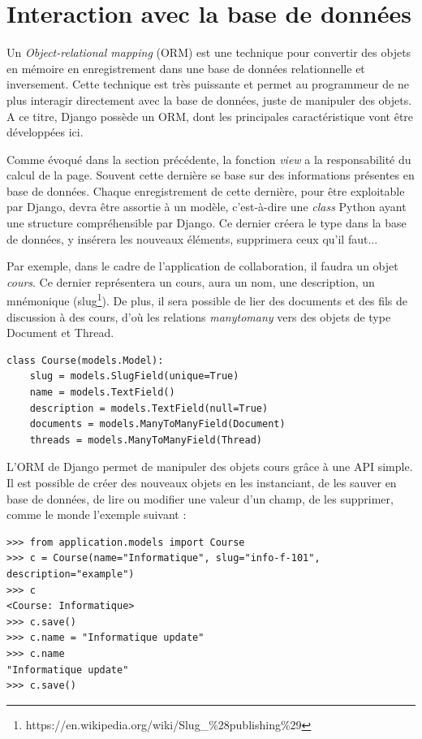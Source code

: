 \documentclass[a4paper,12pt]{article}
\begin{document}
\section{Interaction avec la base de données}

Un \textit{Object-relational mapping} (ORM) est une technique
pour convertir des objets en mémoire en enregistrement dans une base de données
relationnelle et inversement. Cette technique est très puissante et permet
au programmeur de ne plus interagir directement avec la base de données, juste
de manipuler des objets. A ce titre, Django possède un ORM, dont les principales
caractéristique vont être développées ici.

Comme évoqué dans la section précédente, la fonction \textit{view} a la responsabilité
du calcul de la page. Souvent cette dernière se base sur des informations présentes
en base de données. Chaque enregistrement de cette dernière, pour être exploitable
par Django, devra être assortie à un modèle, c'est-à-dire une \textit{class} Python
ayant une structure compréhensible par Django. Ce dernier créera le type dans la
base de données, y insérera les nouveaux éléments, supprimera ceux qu'il faut...

Par exemple, dans le cadre de l'application de collaboration, il faudra un objet
\textit{cours}. Ce dernier représentera un cours, aura un nom, une description,
un mnémonique (slug\footnote{https://en.wikipedia.org/wiki/Slug\_\%28publishing\%29}).
De plus, il sera possible de lier des documents et des fils de discussion à des
cours, d'où les relations \textit{manytomany} vers des objets de type Document
et Thread.

\begin{verbatim}
class Course(models.Model):
    slug = models.SlugField(unique=True)
    name = models.TextField()
    description = models.TextField(null=True)
    documents = models.ManyToManyField(Document)
    threads = models.ManyToManyField(Thread)
\end{verbatim}

L'ORM de Django permet de manipuler des objets cours grâce à une API simple.
Il est possible de créer des nouveaux objets en les instanciant, de les
sauver en base de données, de lire ou modifier une valeur d'un champ,
de les supprimer, comme le monde l'exemple suivant :

\begin{verbatim}
>>> from application.models import Course
>>> c = Course(name="Informatique", slug="info-f-101", description="example")
>>> c
<Course: Informatique>
>>> c.save()
>>> c.name = "Informatique update"
>>> c.name
"Informatique update"
>>> c.save()
\end{verbatim}
\end{document}
